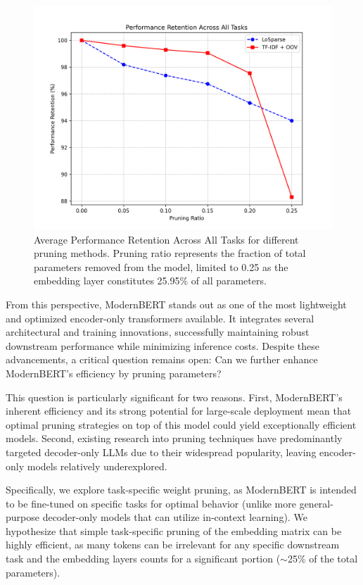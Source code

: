 \documentclass[twocolumn]{article}
\begin{document}
\begin{figure}[t]
\centering
\includegraphics[width=\columnwidth]{images/performance_retention.png}
\caption{Average Performance Retention Across All Tasks for different pruning methods. Pruning ratio represents the fraction of total parameters removed from the model, limited to 0.25 as the embedding layer constitutes 25.95\% of all parameters.}
\label{fig:pruning_retention}
\end{figure}

From this perspective, ModernBERT stands out as one of the most lightweight and optimized encoder-only transformers available. It integrates several architectural and training innovations, successfully maintaining robust downstream performance while minimizing inference costs. Despite these advancements, a critical question remains open: Can we further enhance ModernBERT's efficiency by pruning parameters?

This question is particularly significant for two reasons. First, ModernBERT's inherent efficiency and its strong potential for large-scale deployment mean that optimal pruning strategies on top of this model could yield exceptionally efficient models. Second, existing research into pruning techniques have predominantly targeted decoder-only LLMs \cite{namburi2023llm} due to their widespread popularity, leaving encoder-only models relatively underexplored.

Specifically, we explore task-specific weight pruning, as ModernBERT is intended to be fine-tuned on specific tasks for optimal behavior (unlike more general-purpose decoder-only models that can utilize in-context learning). We hypothesize that simple task-specific pruning of the embedding matrix can be highly efficient, as many tokens can be irrelevant for any specific downstream task and the embedding layers counts for a significant portion ($\sim$25\% of the total parameters).
\end{document}
